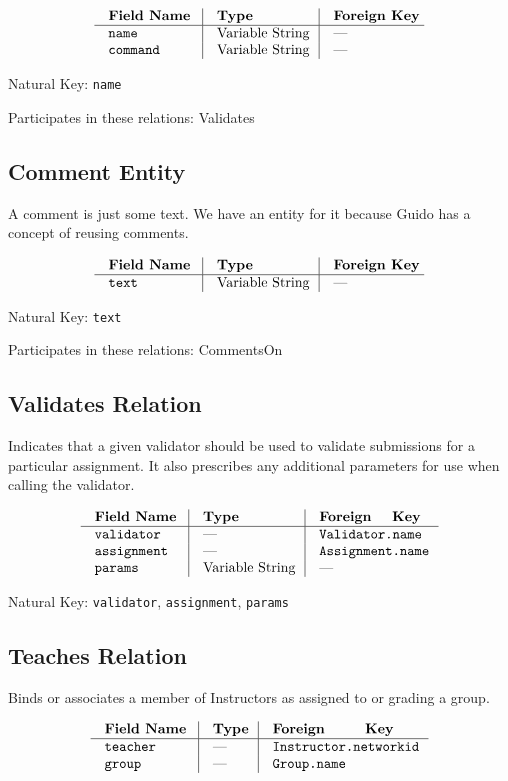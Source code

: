 $$\vbox{
	\offinterlineskip
	\halign{
		\strut \quad {\tt #}	& \vrule\quad #	& \vrule\quad # \cr
		{\bf Field Name}	& {\bf Type}	& {\bf Foreign Key}\cr
		\noalign{\hrule}		
		name	& Variable String	& --- \cr
		command	& Variable String	& --- \cr
	}
}$$

{\noindent
Natural Key: {\tt name}\par\noindent
Participates in these relations: Validates \par}

\subsection{Comment Entity}
A comment is just some text.
We have an entity for it because Guido has a concept of reusing comments.

$$\vbox{
	\offinterlineskip
	\halign{
		\strut \quad {\tt #}	& \vrule\quad #	& \vrule\quad # \cr
		{\bf Field Name}	& {\bf Type}	& {\bf Foreign Key}\cr
		\noalign{\hrule}		
		text	& Variable String	& --- \cr
	}
}$$

{\noindent
Natural Key: {\tt text}\par\noindent
Participates in these relations: CommentsOn \par}

\subsection{Validates Relation}
Indicates that a given validator should be used to validate 
submissions for a particular assignment. It also prescribes any 
additional parameters for use when calling the validator.

$$\vbox{
	\offinterlineskip
	\halign{
		\strut \quad {\tt #}	& \vrule\quad #	& \vrule\quad # \cr
		{\bf Field Name}	& {\bf Type}	& {\bf Foreign Key}\cr
		\noalign{\hrule}		
		validator	& ---	& {\tt Validator.name} \cr
		assignment	& ---	& {\tt Assignment.name} \cr
		params	& Variable String	& --- \cr
	}
}$$

{\noindent
Natural Key: {\tt validator}, {\tt assignment}, {\tt params}\par}

\subsection{Teaches Relation}
Binds or associates a member of Instructors as assigned to or grading a group.

$$\vbox{
	\offinterlineskip
	\halign{
		\strut \quad {\tt #}	& \vrule\quad #	& \vrule\quad # \cr
		{\bf Field Name}	& {\bf Type}	& {\bf Foreign Key}\cr
		\noalign{\hrule}		
		teacher	& ---	& {\tt Instructor.networkid} \cr
		group	& ---	& {\tt Group.name} \cr
	}
}$$


